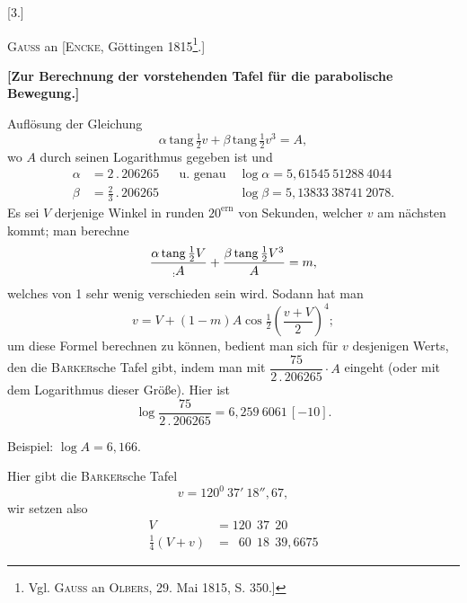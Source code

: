\clearpage
{}
\begingroup
\makeatletter
\newcommand{\LetterThreeFirstNote}[1]{\begingroup\renewcommand{\thefootnote}{*)}\long\def\@makefntext##1{\noindent [*)\ ##1}\footnote{#1}\endgroup}
\makeatother
\begin{center}
[3.]\par\medskip
\textsc{Gauss} an [\textsc{Encke}, Göttingen 1815\LetterThreeFirstNote{Vgl. \textsc{Gauss} an \textsc{Olbers}, 29. Mai 1815, S. 350.]}.]\par\medskip
{\bfseries [Zur Berechnung der vorstehenden Tafel für die parabolische Bewegung.]}
\end{center}
\noindent\hspace*{\parindent}Auflösung der Gleichung
\[
\alpha\,\mathrm{tang}\,\tfrac12v+\beta\,\mathrm{tang}\,\tfrac12v^3=A,
\]
wo \(A\) durch seinen Logarithmus gegeben ist und
\[
\begin{aligned}
\alpha&=2\mathpunct{.}206265&&\text{u. genau}\quad\log\alpha=5{,}61545\ 51288\ 4044\\
\beta&=\tfrac23\mathpunct{.}206265&&\phantom{\text{u. genau}\quad}\log\beta=5{,}13833\ 38741\ 2078.
\end{aligned}
\]
Es sei \(V\) derjenige Winkel in runden \(20^{\mathrm{ern}}\) von Sekunden, welcher \(v\) am nächsten kommt; man berechne
\[
\frac{\alpha\,\mathrm{tang}\,\tfrac12V}{\mathord{\text{\raisebox{-.35ex}{\(\scriptstyle:\)}}}A}
+\frac{\beta\,\mathrm{tang}\,\tfrac12V^3}{A}=m,
\]
welches von 1 sehr wenig verschieden sein wird. Sodann hat man
\[
v=V+(1-m)A\cos\tfrac12\left(\frac{v+V}{2}\right)^4;
\]
um diese Formel berechnen zu können, bedient man sich für \(v\) desjenigen Werts, den die \textsc{Barker}sche Tafel gibt, indem man mit \(\dfrac{75}{2\mathpunct{.}206265}\cdot A\) eingeht (oder mit dem Logarithmus dieser Größe). Hier ist
\[
\log\frac{75}{2\mathpunct{.}206265}=6{,}259\ 6061\,[-10].
\]
\par\medskip
\noindent\hspace*{2\parindent}Beispiel: \(\log A=6{,}166.\)
\par
\noindent\hspace*{\parindent}Hier gibt die \textsc{Barker}sche Tafel
\[
v=120^0\ 37'\ 18''{,}67,
\]
wir setzen also
\[
\begin{aligned}
V&=120\ \ 37\ \ 20\\
\tfrac14(V+v)&=\phantom1 60\ \ 18\ \ 39{,}6675
\end{aligned}
\]
